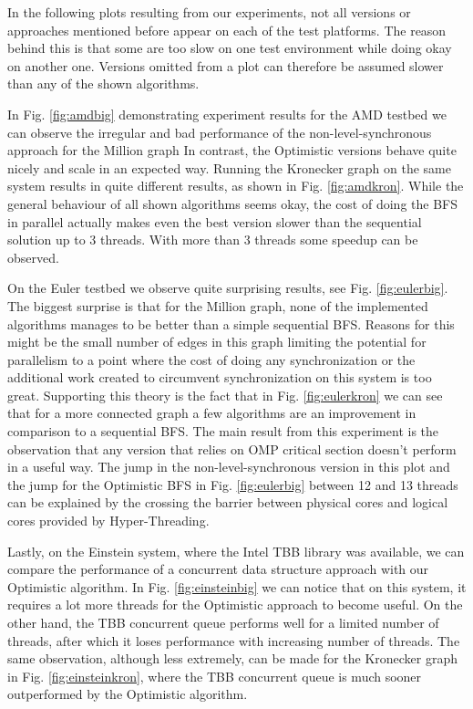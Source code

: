 \documentclass[letterpaper]{article}
\begin{document}


		In the following plots resulting from our experiments, not all versions or approaches mentioned before appear on each of the test platforms. 
		The reason behind this is that some are too slow on one test environment while doing okay on another one.
		Versions omitted from a plot can therefore be assumed slower than any of the shown algorithms.
		
		In Fig. \ref{fig:amdbig} demonstrating experiment results for the AMD testbed we can observe the irregular and bad performance of the non-level-synchronous approach for the Million graph
		In contrast, the Optimistic versions behave quite nicely and scale in an expected way.
		Running the Kronecker graph on the same system results in quite different results, as shown in Fig. \ref{fig:amdkron}.
		While the general behaviour of all shown algorithms seems okay, the cost of doing the BFS in parallel actually makes even the best version slower than the sequential solution up to 3 threads.
		With more than 3 threads some speedup can be observed. 
		
		On the Euler testbed we observe quite surprising results, see Fig. \ref{fig:eulerbig}.
		The biggest surprise is that for the Million graph, none of the implemented algorithms manages to be better than a simple sequential BFS.
		Reasons for this might be the small number of edges in this graph limiting the potential for parallelism to a point where the cost of doing any synchronization or the additional work created to circumvent synchronization on this system is too great.
		Supporting this theory is the fact that in Fig. \ref{fig:eulerkron} we can see that for a more connected graph a few algorithms are an improvement in comparison to a sequential BFS.
		The main result from this experiment is the observation that any version that relies on OMP critical section doesn't perform in a useful way.
		The jump in the non-level-synchronous version in this plot and the jump for the Optimistic BFS in Fig. \ref{fig:eulerbig} between 12 and 13 threads can be explained by the crossing the barrier between physical cores and logical cores provided by Hyper-Threading.

		Lastly, on the Einstein system, where the Intel TBB library was available, we can compare the performance of a concurrent data structure approach with our Optimistic algorithm.
		In Fig. \ref{fig:einsteinbig} we can notice that on this system, it requires a lot more threads for the Optimistic approach to become useful. On the other hand, the TBB concurrent queue performs well for a limited number of threads, after which it loses performance with increasing number of threads.		
		The same observation, although less extremely, can be made for the Kronecker graph in Fig. \ref{fig:einsteinkron}, where the TBB concurrent queue is much sooner outperformed by the Optimistic algorithm.
\end{document}
